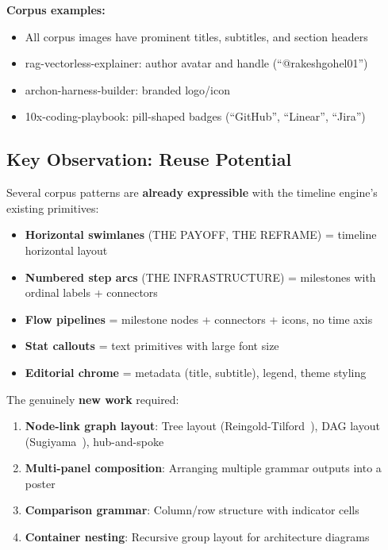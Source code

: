 \textbf{Corpus examples:}
\begin{itemize}
  \item All corpus images have prominent titles, subtitles, and section headers
  \item rag-vectorless-explainer: author avatar and handle (``@rakeshgohel01'')
  \item archon-harness-builder: branded logo/icon
  \item 10x-coding-playbook: pill-shaped badges (``GitHub'', ``Linear'', ``Jira'')
\end{itemize}

\subsection{Key Observation: Reuse Potential}

Several corpus patterns are \textbf{already expressible} with the timeline engine's existing primitives:

\begin{itemize}
  \item \textbf{Horizontal swimlanes} (THE PAYOFF, THE REFRAME) = timeline horizontal layout
  \item \textbf{Numbered step arcs} (THE INFRASTRUCTURE) = milestones with ordinal labels + connectors
  \item \textbf{Flow pipelines} = milestone nodes + connectors + icons, no time axis
  \item \textbf{Stat callouts} = text primitives with large font size
  \item \textbf{Editorial chrome} = metadata (title, subtitle), legend, theme styling
\end{itemize}

The genuinely \textbf{new work} required:

\begin{enumerate}
  \item \textbf{Node-link graph layout}: Tree layout (Reingold-Tilford~\cite{reingold1981}), DAG layout (Sugiyama~\cite{sugiyama1981}), hub-and-spoke
  \item \textbf{Multi-panel composition}: Arranging multiple grammar outputs into a poster
  \item \textbf{Comparison grammar}: Column/row structure with indicator cells
  \item \textbf{Container nesting}: Recursive group layout for architecture diagrams
\end{enumerate}

